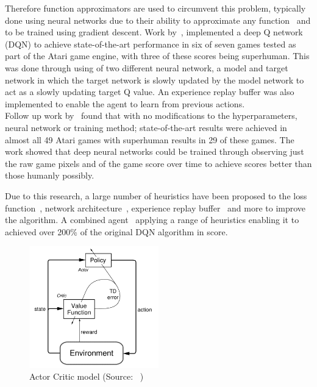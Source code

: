 Therefore function approximators are used to circumvent this problem, typically done using neural networks due to their
ability to approximate any function~\citep{csaji2001approximation} and to be trained using gradient descent.
Work by~\cite{atari}, implemented a deep Q network (DQN) to achieve state-of-the-art performance in six
of seven games tested as part of the Atari game engine, with three of these scores being superhuman. This was done
through using of two different neural network, a model and target network in which the target network is slowly
updated by the model network to act as a slowly updating target Q value. An experience replay buffer was also
implemented to enable the agent to learn from previous actions. \\
Follow up work by~\cite{mnih2015humanlevel} found that with no modifications to the hyperparameters, neural network or
training method; state-of-the-art results were achieved in almost all 49 Atari games with superhuman results in 29 of
these games. The work showed that deep neural networks could be trained through observing just the raw game pixels and
of the game score over time to achieve scores better than those humanly possibly.

Due to this research, a large number of heuristics have been proposed to the loss function~\citep{doubledqn},
network architecture~\citep{duelingdqn}, experience replay buffer~\citep{prioritizedexperiencereplay} and more to
improve the algorithm. A combined agent~\citep{rainbow} applying a range of heuristics enabling it to
achieved over 200\% of the original DQN algorithm in score.

\begin{figure}
    \includegraphics[width=0.5\textwidth]{figures/1_background_lit_figs/actor-critic.png}
    \caption{Actor Critic model (Source: ~\cite{Sutton1998})}
    \label{fig:actor-critic-model}
\end{figure}

